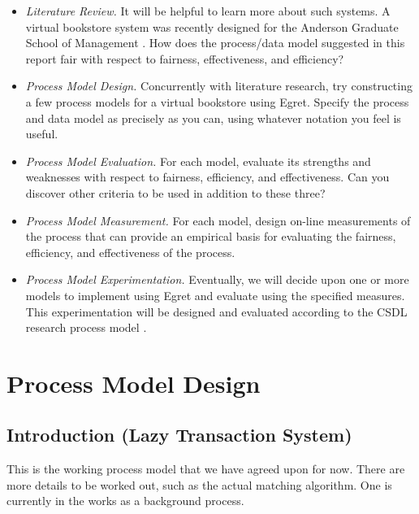 \begin{itemize}
  
\item {\em Literature Review.} It will be helpful to learn more about such
  systems.  A virtual bookstore system was recently designed for the Anderson
  Graduate School of Management \cite{bookstore-AGSM94}.  How does the
  process/data model suggested in this report fair with respect to fairness,
  effectiveness, and efficiency?

\item {\em Process Model Design.} Concurrently with literature research,
  try constructing a few process models for a virtual bookstore using Egret.
  Specify the process and data model as precisely as you can, using whatever
  notation you feel is useful.

\item {\em Process Model Evaluation.} For each model, evaluate its
  strengths and weaknesses with respect to fairness, efficiency, and
  effectiveness.  Can you discover other criteria to be used in addition to
  these three?
  
\item {\em Process Model Measurement.} For each model, design on-line
  measurements of the process that can provide an empirical basis for
  evaluating the fairness, efficiency, and effectiveness of the process.
  
\item {\em Process Model Experimentation.} Eventually, we will decide upon
  one or more models to implement using Egret and evaluate using the
  specified measures.  This experimentation will be designed and 
  evaluated according to the CSDL research process model \cite{csdl-ro-93-01}. 

\end{itemize}



\chapter{Process Model Design}

\section{Introduction (Lazy Transaction System)}

This is the working process model that we have agreed upon for now.  There
are more details to be worked out, such as the actual matching algorithm.  One
is currently in the works as a background process.


